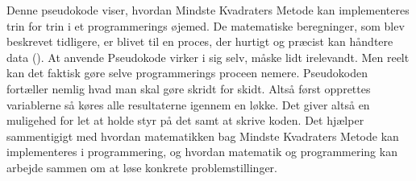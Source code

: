 Denne pseudokode viser, hvordan Mindste Kvadraters Metode kan implementeres trin for trin i et programmerings øjemed. De matematiske beregninger, som blev beskrevet tidligere, er blivet til en proces, der hurtigt og præcist kan håndtere data (\cite{codesansar}). At anvende Pseudokode virker i sig selv, måske lidt irelevandt. Men reelt kan det faktisk gøre selve programmerings proceen nemere. Pseudokoden fortæller nemlig hvad man skal gøre skridt for skidt. Altså først opprettes variablerne så køres alle resultaterne igennem en løkke. Det giver altså en muligehed for let at holde styr på det samt at skrive koden. Det hjælper sammentigigt med hvordan matematikken bag Mindste Kvadraters Metode kan implementeres i programmering, og hvordan matematik og programmering kan arbejde sammen om at løse konkrete problemstillinger.

